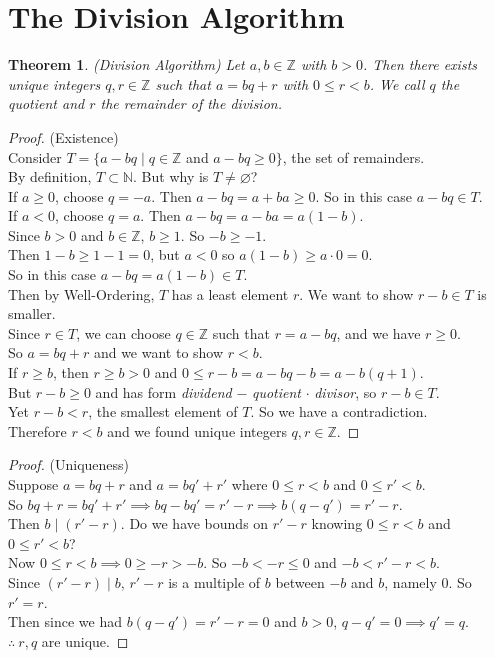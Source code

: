 \documentclass[11pt]{amsart}
\newtheorem{theorem}{Theorem}[section]
\theoremstyle{definition}
\newcommand{\integers}{\mathbb{Z}}
\newcommand{\naturals}{\mathbb{N}}
\let\emptyset\varnothing
\begin{document}
\newpage
\section{The Division Algorithm}
\begin{theorem}(Division Algorithm)
	Let $a, b \in \integers$ with $b > 0$. Then there exists unique integers $q, r \in \integers$ such that $a = bq + r$ with $0 \leq r < b$. We
	call $q$ the quotient and $r$ the remainder of the division.
\end{theorem}
\begin{proof}(Existence) \\
	Consider $T = \{ a - bq \mid q \in \integers$ and $a - bq \geq 0 \}$, the set of remainders. \\
	By definition, $T \subset \naturals$. But why is $T \neq \emptyset$? \\
	If $a \geq 0$, choose $q = -a$. Then $a - bq = a + ba \geq 0$. So in this case $a - bq \in T$. \\
	If $a < 0$, choose $q = a$. Then $a - bq = a - ba = a(1 - b)$. \\
	Since $b > 0$ and $b \in \integers$, $b \geq 1$. So $-b \geq -1$. \\
	Then $1 - b \geq 1 - 1 = 0$, but $a < 0$ so $a(1 - b) \geq a \cdot 0 = 0$. \\
	So in this case $a - bq = a(1 - b) \in T$. \\
	Then by Well-Ordering, $T$ has a least element $r$. We want to show $r - b \in T$ is smaller. \\
	Since $r \in T$, we can choose $q \in \integers$ such that $r = a - bq$, and we have $r \geq 0$. \\
	So $a = bq + r$ and we want to show $r < b$. \\
	If $r \geq b$, then $r \geq b > 0$ and $0 \leq r - b = a - bq - b = a - b(q + 1)$. \\
	But $r - b \geq 0$ and has form \textit{dividend} $ - $ \textit{quotient} $\cdot$ \textit{divisor}, so $r - b \in T$. \\
	Yet $r - b < r$, the smallest element of $T$. So we have a contradiction. \\
	Therefore $r < b$ and we found unique integers $q, r \in \integers$.
\end{proof}
\begin{proof}(Uniqueness) \\
	Suppose $a = bq + r$ and $a = bq' + r'$ where $0 \leq r < b$ and $0 \leq r' < b$. \\
	So $bq + r = bq' + r' \implies bq - bq' = r' - r \implies b(q - q') = r' - r$. \\
	Then $b \mid (r' - r)$. Do we have bounds on $r' - r$ knowing $0 \leq r < b$ and $0 \leq r' < b$? \\
	Now $0 \leq r < b \implies 0 \geq -r > -b$. So $-b < -r \leq 0$ and $-b < r' - r < b$. \\
	Since $(r' - r) \mid b$, $r' - r$ is a multiple of $b$ between $-b$ and $b$, namely 0. So $r' = r$. \\
	Then since we had $b(q - q') = r' - r = 0$ and $b > 0$, $q - q' = 0 \implies q' = q$. \\
	$ \therefore \: r, q$ are unique.
\end{proof}
\end{document}

